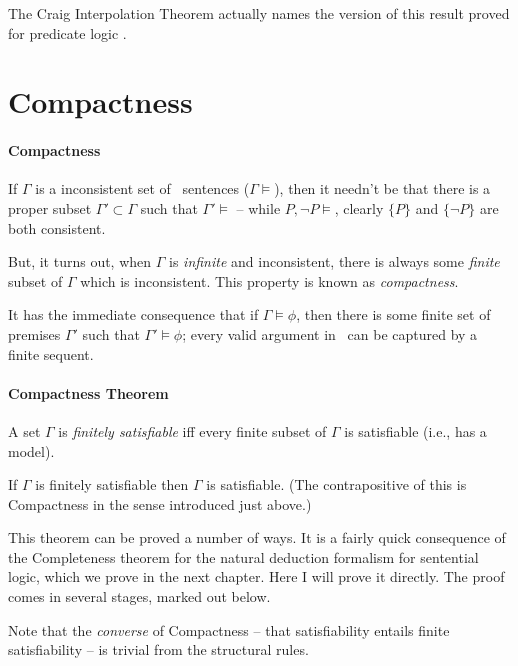 The Craig Interpolation Theorem actually names the version of this result proved for predicate logic  \citep{crathrush}.


\section{Compactness}


\paragraph{Compactness}

If $\Gamma$ is a inconsistent set of \lone\ sentences ($\Gamma\vDash$), then it needn't be that there is a proper subset $\Gamma' \subset \Gamma$ such that $\Gamma'\vDash$ – while $P,\neg P\vDash$, clearly $\{P\}$ and $\{\neg P\}$ are both consistent.

But, it turns out, when $\Gamma$ is \emph{infinite} and inconsistent, there is always some \emph{finite} subset of $\Gamma$ which is inconsistent. This property is known as \emph{compactness}. 

It has the immediate consequence that if $\Gamma\vDash\phi$, then there is some finite set of premises $\Gamma'$ such that $\Gamma'\vDash\phi$; every valid argument in \lone\ can be captured by a finite sequent.

\paragraph{Compactness Theorem}

A set $\Gamma$ is \emph{finitely satisfiable} iff every finite subset of $\Gamma$ is satisfiable (i.e., has a model).
 
\begin{theorem}[Compactness]\label{compact}
If $\Gamma$ is finitely satisfiable then $\Gamma$ is satisfiable. (The contrapositive of this is Compactness in the sense introduced just above.)	
\end{theorem}

This theorem can be proved a number of ways. It is a fairly quick consequence of the Completeness theorem for the natural deduction formalism for sentential logic, which we  prove in the next chapter. Here I will prove it directly. The proof comes in several stages, marked out below.

Note that the \emph{converse} of Compactness – that satisfiability entails finite satisfiability – is trivial from the structural rules.

